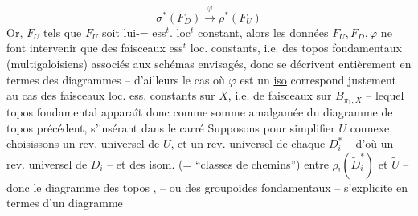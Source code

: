 \[
\boxed{\sigma^{*}(F_D)\xrightarrow{\varphi}\rho^{*}(F_U)}
\]
Or,   $F_U$ tels que $F_U$ soit
lui-= ess$^{t}$. loc$^{t}$ constant, alors les données
$F_U,F_D,\varphi$ ne font intervenir que des
faisceaux ess$^{t}$ loc. constants, i.e. des
topos fondamentaux (multigaloisiens)
associés aux schémas envisagés,  donc
se décrivent entièrement en termes des
diagrammes
\margin{(*)}
-- d'ailleurs le cas où $\varphi$ est un \uline{iso} correspond
justement au cas des faisceaux loc. ess.
constants sur $X$, i.e. de faisceaux sur
$B_{\pi_1,X}$ -- lequel topos fondamental
apparaît donc comme somme
amalgamée du diagramme de topos
précédent, s'insérant dans le carré
Supposons pour simplifier $U$ connexe,
choisissons un rev. universel  de $U$, et un
rev. universel  de chaque $D_i^{*}$ -- d'où un
rev. universel  de $D_i$ -- et des isom.
(= ``classes de chemins'') entre $\rho_{!}(\widetilde D_i^{*})$ et $\widetilde U$
-- donc le diagramme des topos \unsure{(*)},
-- ou des groupoïdes fondamentaux --
s'explicite en termes d'un diagramme
